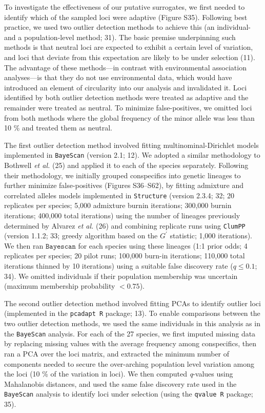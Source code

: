 \documentclass[9pt,twocolumn,twoside,lineno]{pnas-new}
\begin{document}
To investigate the effectiveness of our putative surrogates, we first
needed to identify which of the sampled loci were adaptive (Figure S35).
Following best practice, we used two outlier detection methods to
achieve this (an individual- and a population-level method; 31). The
basic premise underpinning such methods is that neutral loci are
expected to exhibit a certain level of variation, and loci that deviate
from this expectation are likely to be under selection (11). The
advantage of these methods---in contrast with environmental association
analyses---is that they do not use environmental data, which would have
introduced an element of circularity into our analysis and invalidated
it. Loci identified by both outlier detection methods were treated as
adaptive and the remainder were treated as neutral. To minimize
false-positives, we omitted loci from both methods where the global
frequency of the minor allele was less than 10 \% and treated them as
neutral.

The first outlier detection method involved fitting
multinominal-Dirichlet models implemented in \texttt{BayeScan} (version
2.1; 12). We adopted a similar methodology to Bothwell \emph{et al.}
(25) and applied it to each of the species separately. Following their
methodology, we initially grouped conspecifics into genetic lineages to
further minimize false-positives (Figures S36--S62), by fitting
admixture and correlated alleles models implemented in
\texttt{Structure} (version 2.3.4; 32; 20 replicates per species; 5,000
admixture burnin iterations; 300,000 burnin iterations; 400,000 total
iterations) using the number of lineages previously determined by
Alvarez \emph{et al.} (26) and combining replicate runs using
\texttt{ClumPP} (version 1.1.2; 33; greedy algorithm based on the
\(G^{\prime}\) statistic; 1,000 iterations). We then ran
\(\texttt{Bayescan}\) for each species using these lineages (1:1 prior
odds; 4 replicates per species; 20 pilot runs; 100,000 burn-in
iterations; 110,000 total iterations thinned by 10 iterations) using a
suitable false discovery rate (\(q \leq 0.1\); 34). We omitted
individuals if their population membership was uncertain (maximum
membership probability \(< 0.75\)).

The second outlier detection method involved fitting PCAs to identify
outlier loci (implemented in the \texttt{pcadapt R} package; 13). To
enable comparisons between the two outlier detection methods, we used
the same individuals in this analysis as in the \texttt{BayeScan}
analysis. For each of the 27 species, we first imputed missing data by
replacing missing values with the average frequency among conspecifics,
then ran a PCA over the loci matrix, and extracted the minimum number of
components needed to secure the over-arching population level variation
among the loci (10 \% of the variation in loci). We then computed
\emph{q}-values using Mahalanobis distances, and used the same false
discovery rate used in the \texttt{BayeScan} analysis to identify loci
under selection (using the \texttt{qvalue R} package; 35).
\end{document}
